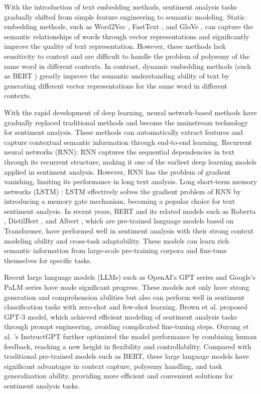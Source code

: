 \documentclass{article}
\begin{document}
With the introduction of text embedding methods, sentiment analysis tasks gradually shifted from simple feature engineering to semantic modeling. Static embedding methods, such as Word2Vec {\color{blue}{[13]}}, FastText {\color{blue}{[14]}}{\color{blue}{[15]}}{\color{blue}{[16]}}, and GloVe {\color{blue}{[17]}}, can capture the semantic relationships of words through vector representations and significantly improve the quality of text representation. However, these methods lack sensitivity to context and are difficult to handle the problem of polysemy of the same word in different contexts. In contrast, dynamic embedding methods (such as BERT {\color{blue}{[9]}}) greatly improve the semantic understanding ability of text by generating different vector representations for the same word in different contexts.

\hypertarget{hpa.3}{{}}With the rapid development of deep learning, neural network-based methods have gradually replaced traditional methods and become the mainstream technology for sentiment analysis. These methods can automatically extract features and capture contextual semantic information through end-to-end learning. Recurrent neural networks (RNN){\color{blue}{[5]}}{\color{blue}{[6]}}: RNN captures the sequential dependencies in text through its recurrent structure, making it one of the earliest deep learning models applied in sentiment analysis. However, RNN has the problem of gradient vanishing, limiting its performance in long text analysis. Long short-term memory networks (LSTM) {\color{blue}{[7]}}{\color{blue}{[8]}}: LSTM effectively solves the gradient problem of RNN by introducing a memory gate mechanism, becoming a popular choice for text sentiment analysis. In recent years, BERT {\color{blue}{[9]}} and its related models such as Roberta {\color{blue}{[18]}}, DistilBert {\color{blue}{[19]}}, and Albert {\color{blue}{[20]}}, which are pre-trained language models based on Transformer, have performed well in sentiment analysis with their strong context modeling ability and cross-task adaptability. These models can learn rich semantic information from large-scale pre-training corpora and fine-tune themselves for specific tasks. 

Recent large language models (LLMs) such as OpenAI's GPT series and Google's PaLM series have made significant progress. These models not only have strong generation and comprehension abilities but also can perform well in sentiment classification tasks with zero-shot and few-shot learning. Brown et al. {\color{blue}{[21]}} proposed GPT-3 model, which achieved efficient modeling of sentiment analysis tasks through prompt engineering, avoiding complicated fine-tuning steps. Ouyang et al. 's InstructGPT {\color{blue}{[22]}} further optimized the model performance by combining human feedback, reaching a new height in flexibility and controllability. Compared with traditional pre-trained models such as BERT, these large language models have significant advantages in context capture, polysemy handling, and task generalization ability, providing more efficient and convenient solutions for sentiment analysis tasks.
\end{document}

